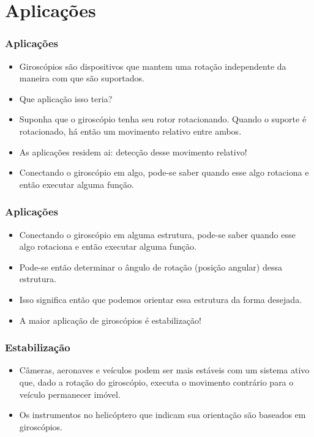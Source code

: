 \documentclass{beamer}
\begin{document}



\section{Aplicações}


\begin{frame}
\frametitle{Aplicações}
\begin{itemize}
\item Giroscópios são dispositivos que mantem uma rotação independente da maneira com que são suportados.
\item Que aplicação isso teria?
\pause
\item Suponha que o giroscópio tenha seu rotor rotacionando. Quando o suporte é rotacionado, há então um movimento relativo entre ambos.
\item As aplicações residem ai: detecção desse movimento relativo!
\item Conectando o giroscópio em algo, pode-se saber quando esse algo rotaciona e então executar alguma função.
\end{itemize}
\end{frame}


\begin{frame}
\frametitle{Aplicações}
\begin{itemize}
\item Conectando o giroscópio em alguma estrutura, pode-se saber quando esse algo rotaciona e então executar alguma função.
\item Pode-se então determinar o ângulo de rotação (posição angular) dessa estrutura.
\item Isso significa então que podemos orientar essa estrutura da forma desejada.
\pause
\item A maior aplicação de giroscópios é estabilização!
\end{itemize}
\end{frame}

\begin{frame}
\frametitle{Estabilização}
\begin{itemize}
\item Câmeras, aeronaves e veículos podem ser mais estáveis com um sistema ativo que, dado a rotação do giroscópio, executa o movimento contrário para o veículo permanecer imóvel. 
\item Os instrumentos no helicóptero que indicam sua orientação são baseados em giroscópios.
\end{itemize}
\end{frame}
\end{document}
